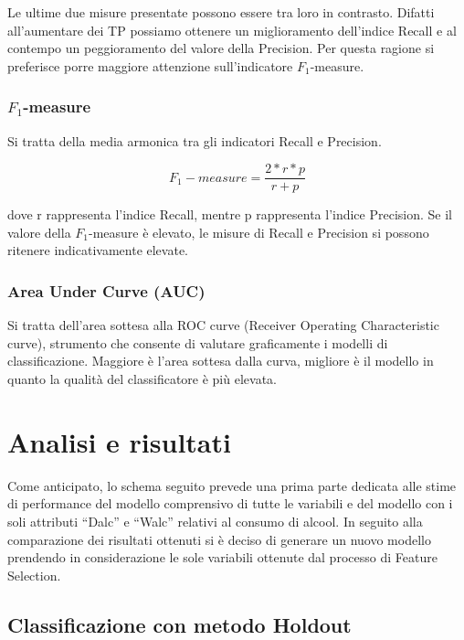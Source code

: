 \documentclass[12pt,a4paper]{report}
\begin{document}
\begin{multicols}{2}
	Le ultime due misure presentate possono essere tra loro in contrasto.  Difatti all'aumentare dei TP possiamo ottenere un miglioramento dell'indice Recall e al contempo un peggioramento del valore della Precision. Per questa ragione si preferisce porre maggiore attenzione sull’indicatore $F_1$-measure.
	
\subsection{$F_1$-measure}	
	Si tratta della media armonica tra gli indicatori Recall e Precision. 	
	
	\begin{equation}
	F_1-measure = \frac{2*r*p}{r+p}
\end{equation}

dove r rappresenta l'indice Recall, mentre p rappresenta l'indice Precision. Se il valore della $F_1$-measure è elevato, le misure di Recall e Precision si possono ritenere indicativamente elevate. 

\subsection{Area Under Curve (AUC)}	
	Si tratta dell’area sottesa alla ROC curve (Receiver Operating Characteristic curve), strumento che consente di valutare graficamente i modelli di classificazione. Maggiore è l’area sottesa dalla curva, migliore è il modello in quanto la qualità del classificatore è più elevata.
	
	
	\chapter{Analisi e risultati}
	
	Come anticipato, lo schema seguito prevede una prima parte dedicata alle stime di performance del modello comprensivo di tutte le variabili e del modello con i soli attributi “Dalc” e “Walc” relativi al consumo di alcool. In seguito alla comparazione dei risultati ottenuti si è deciso di generare un nuovo modello prendendo in considerazione le sole variabili ottenute dal processo di Feature Selection.
	\section{Classificazione con metodo Holdout}




\end{multicols}
\end{document}
